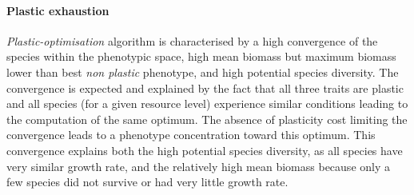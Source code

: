 



\paragraph{Plastic exhaustion}

\textit{Plastic-optimisation} algorithm is characterised by a high convergence of the species within the phenotypic space, high mean biomass but maximum biomass lower than best \textit{non plastic} phenotype, and high potential species diversity. The convergence is expected and explained by the fact that all three traits are plastic and all species (for a given resource level) experience similar conditions leading to the computation of the same optimum. The absence of plasticity cost limiting the convergence leads to a phenotype concentration toward this optimum. This convergence explains both the high potential species diversity, as all species have very similar growth rate, and the relatively high mean biomass because only a few species did not survive or had very little growth rate.

